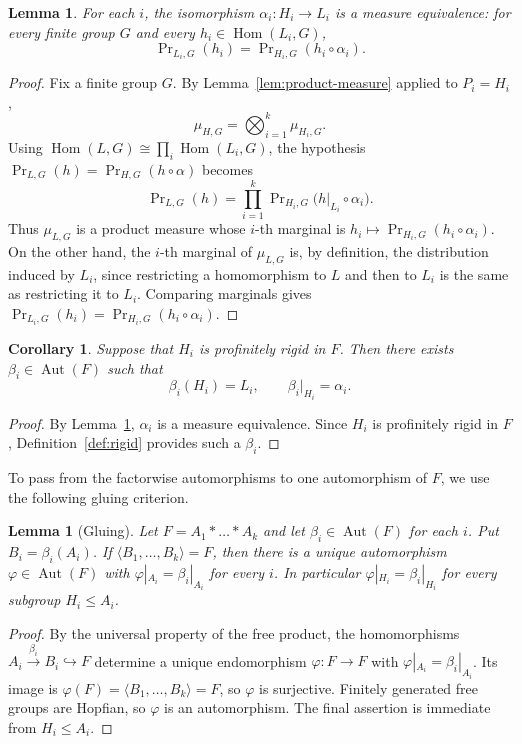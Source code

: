 \documentclass[11pt]{amsart}
\theoremstyle{plain}
\newtheorem{lemma}[theorem]{Lemma}
\newtheorem{corollary}[theorem]{Corollary}
\theoremstyle{definition}
\newcommand{\Hom}{\operatorname{Hom}}
\newcommand{\Aut}{\operatorname{Aut}}
\begin{document}
\begin{lemma}\label{lem:factorwise}
For each $i$, the isomorphism $\alpha_i\colon H_i\to L_i$ is a measure
equivalence: for every finite group $G$ and every $h_i\in\Hom(L_i,G)$,
\[
  \Pr\nolimits_{L_i,G}(h_i)=\Pr\nolimits_{H_i,G}(h_i\circ\alpha_i).
\]
\end{lemma}

\begin{proof}
Fix a finite group $G$.  By Lemma~\ref{lem:product-measure} applied to
$P_i=H_i$,
\[
  \mu_{H,G}=\bigotimes_{i=1}^{k}\mu_{H_i,G}.
\]
Using $\Hom(L,G)\cong\prod_i\Hom(L_i,G)$, the hypothesis
$\Pr_{L,G}(h)=\Pr_{H,G}(h\circ\alpha)$ becomes
\[
  \Pr\nolimits_{L,G}(h)=\prod_{i=1}^{k}
  \Pr\nolimits_{H_i,G}\bigl(h|_{L_i}\circ\alpha_i\bigr).
\]
Thus $\mu_{L,G}$ is a product measure whose $i$-th marginal is
$h_i\mapsto\Pr_{H_i,G}(h_i\circ\alpha_i)$.  On the other hand, the $i$-th
marginal of $\mu_{L,G}$ is, by definition, the distribution induced by $L_i$,
since restricting a homomorphism to $L$ and then to $L_i$ is the same as
restricting it to $L_i$.  Comparing marginals gives
$\Pr_{L_i,G}(h_i)=\Pr_{H_i,G}(h_i\circ\alpha_i)$.
\end{proof}

\begin{corollary}\label{cor:betai}
Suppose that $H_i$ is profinitely rigid in $F$. Then there exists
$\beta_i\in\Aut(F)$ such that
\[
  \beta_i(H_i)=L_i,\qquad \beta_i|_{H_i}=\alpha_i.
\]
\end{corollary}

\begin{proof}
By Lemma~\ref{lem:factorwise}, $\alpha_i$ is a measure equivalence.  Since
$H_i$ is profinitely rigid in $F$, Definition~\ref{def:rigid} provides such a
$\beta_i$.
\end{proof}

To pass from the factorwise automorphisms to one automorphism of $F$, we use the
following gluing criterion.

\begin{lemma}[Gluing]\label{lem:gluing}
Let $F=A_1*\dots*A_k$ and let $\beta_i\in\Aut(F)$ for each $i$.  Put
$B_i=\beta_i(A_i)$.  If $\langle B_1,\dots,B_k\rangle=F$, then there is a unique
automorphism $\varphi\in\Aut(F)$ with $\varphi|_{A_i}=\beta_i|_{A_i}$ for every
$i$.  In particular $\varphi|_{H_i}=\beta_i|_{H_i}$ for every subgroup
$H_i\le A_i$.
\end{lemma}

\begin{proof}
By the universal property of the free product, the homomorphisms
$A_i\xrightarrow{\beta_i}B_i\hookrightarrow F$ determine a unique endomorphism
$\varphi\colon F\to F$ with $\varphi|_{A_i}=\beta_i|_{A_i}$.  Its image is
$\varphi(F)=\langle B_1,\dots,B_k\rangle=F$, so $\varphi$ is surjective.
Finitely generated free groups are Hopfian, so $\varphi$ is an automorphism.  The
final assertion is immediate from $H_i\le A_i$.
\end{proof}
\end{document}
